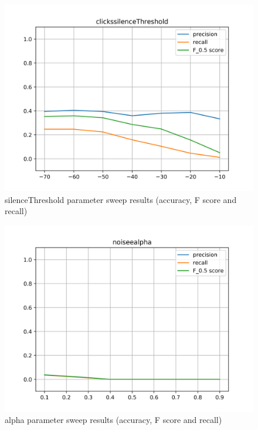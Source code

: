 \begin{figure}[!ht]
	\includegraphics[clip,width=\columnwidth]{Figures/clickssilenceThreshold.png}%
	\caption{silenceThreshold parameter sweep results (accuracy, F score and recall)}
	\label{fig:clickssilenceThreshold}
\end{figure}

\begin{figure}[!ht]
	\includegraphics[clip,width=\columnwidth]{Figures/noiseealpha.png}%
	\caption{alpha parameter sweep results (accuracy, F score and recall)}
	\label{fig:noiseealpha}
\end{figure}

